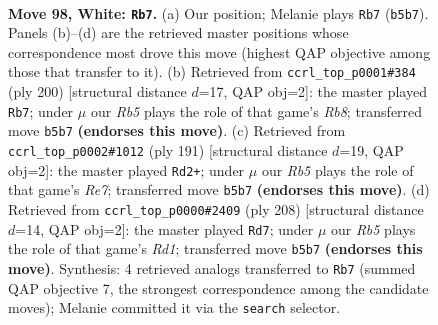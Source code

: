 \documentclass[11pt]{article}
\begin{document}
\clearpage

\begin{figure}[p]\centering
\begin{subfigure}{0.46\textwidth}\centering
\resizebox{\linewidth}{!}{%
\newchessgame
\chessboard[
  setfen={1B5k/8/4r3/1R5P/4p3/5p2/3K1P2/8 w - - 3 98},
  showmover=false,
  pgfstyle=straightmove, color=movearrow, markmove={b5-b7}
]}
\caption{}
\end{subfigure}\hfill
\begin{subfigure}{0.46\textwidth}\centering
\resizebox{\linewidth}{!}{%
\newchessgame
\chessboard[
  setfen={1R2B3/5pk1/4p3/8/6K1/6P1/5r2/8 w - - 56 101},
  showmover=false,
  pgfstyle=straightmove, color=movearrow, markmove={b8-b7}
]}
\caption{}
\end{subfigure}
\\[4pt]
\begin{subfigure}{0.46\textwidth}\centering
\resizebox{\linewidth}{!}{%
\newchessgame
\chessboard[
  setfen={8/6k1/3K4/6Pp/2R4P/8/4r3/8 b - - 18 96},
  showmover=false,
  pgfstyle=straightmove, color=movearrow, markmove={e2-d2}
]}
\caption{}
\end{subfigure}\hfill
\begin{subfigure}{0.46\textwidth}\centering
\resizebox{\linewidth}{!}{%
\newchessgame
\chessboard[
  setfen={8/8/5pk1/4p3/7P/1r6/6K1/3RB3 w - - 99 105},
  showmover=false,
  pgfstyle=straightmove, color=movearrow, markmove={d1-d7}
]}
\caption{}
\end{subfigure}
\caption{\textbf{Move 98, White: \texttt{Rb7}.} (a) Our position; Melanie plays \texttt{Rb7} (\texttt{b5b7}). Panels (b)--(d) are the retrieved master positions whose correspondence most drove this move (highest QAP objective among those that transfer to it). (b) Retrieved from \texttt{ccrl\_top\_p0001\#384} (ply 200) [structural distance $d$=17, QAP obj=2]: the master played \texttt{Rb7}; under $\mu$ our \emph{Rb5} plays the role of that game's \emph{Rb8}; transferred move \texttt{b5b7} \textbf{(endorses this move)}. (c) Retrieved from \texttt{ccrl\_top\_p0002\#1012} (ply 191) [structural distance $d$=19, QAP obj=2]: the master played \texttt{Rd2+}; under $\mu$ our \emph{Rb5} plays the role of that game's \emph{Re7}; transferred move \texttt{b5b7} \textbf{(endorses this move)}. (d) Retrieved from \texttt{ccrl\_top\_p0000\#2409} (ply 208) [structural distance $d$=14, QAP obj=2]: the master played \texttt{Rd7}; under $\mu$ our \emph{Rb5} plays the role of that game's \emph{Rd1}; transferred move \texttt{b5b7} \textbf{(endorses this move)}. Synthesis: 4 retrieved analogs transferred to \texttt{Rb7} (summed QAP objective 7, the strongest correspondence among the candidate moves); Melanie committed it via the \texttt{search} selector.}
\label{fig:thought-m194}
\end{figure}
\end{document}
